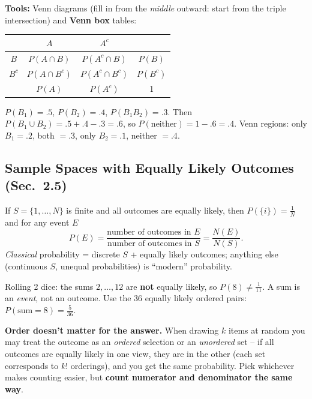 \documentclass[11pt]{article}
\let\oldsubsection\subsection
\renewcommand{\subsection}{\Needspace{14\baselineskip}\oldsubsection}
\begin{document}
\textbf{Tools:} Venn diagrams (fill in from the \emph{middle} outward: start from the triple intersection) and \textbf{Venn box} tables:
\begin{center}
\begin{tabular}{c|cc|c}
 & $A$ & $A^c$ & \\\hline
$B$ & $P(A\cap B)$ & $P(A^c\cap B)$ & $P(B)$\\
$B^c$ & $P(A\cap B^c)$ & $P(A^c\cap B^c)$ & $P(B^c)$\\\hline
 & $P(A)$ & $P(A^c)$ & 1
\end{tabular}
\end{center}

\begin{exbox}
$P(B_1)=.5$, $P(B_2)=.4$, $P(B_1B_2)=.3$. Then $P(B_1\cup B_2)=.5+.4-.3=.6$, so $P(\text{neither})=1-.6=.4$. Venn regions: only $B_1=.2$, both $=.3$, only $B_2=.1$, neither $=.4$.
\end{exbox}

\subsection{Sample Spaces with Equally Likely Outcomes (Sec.\ 2.5)}

\begin{defbox}
If $S=\{1,\dots,N\}$ is finite and all outcomes are equally likely, then $P(\{i\})=\frac1N$ and for any event $E$
\[ P(E)=\frac{\text{number of outcomes in }E}{\text{number of outcomes in }S}=\frac{N(E)}{N(S)}. \]
\emph{Classical} probability = discrete $S$ + equally likely outcomes; anything else (continuous $S$, unequal probabilities) is ``modern'' probability.
\end{defbox}

\begin{warnbox}
Rolling 2 dice: the sums $2,\dots,12$ are \textbf{not} equally likely, so $P(8)\ne\frac1{11}$. A sum is an \emph{event}, not an outcome. Use the 36 equally likely ordered pairs: $P(\text{sum}=8)=\frac5{36}$.
\end{warnbox}

\textbf{Order doesn't matter for the answer.} When drawing $k$ items at random you may treat the outcome as an \emph{ordered} selection or an \emph{unordered} set -- if all outcomes are equally likely in one view, they are in the other (each set corresponds to $k!$ orderings), and you get the same probability. Pick whichever makes counting easier, but \textbf{count numerator and denominator the same way}.
\end{document}
